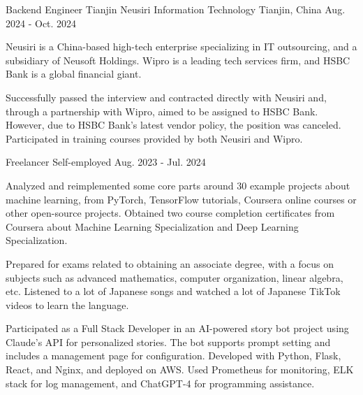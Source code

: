 
\begin{cventries}

  \cventry
    {Backend Engineer} %
    {Tianjin Neusiri Information Technology} %
    {Tianjin, China} %
    {Aug. 2024 - Oct. 2024} %
    {
      \begin{cvitems} %
        \item {Neusiri is a China-based high-tech enterprise specializing in IT outsourcing, and a subsidiary of Neusoft Holdings. Wipro is a leading tech services firm, and HSBC Bank is a global financial giant.}
        \item {Successfully passed the interview and contracted directly with Neusiri and, through a partnership with Wipro, aimed to be assigned to HSBC Bank. However, due to HSBC Bank's latest vendor policy, the position was canceled. Participated in training courses provided by both Neusiri and Wipro.}
      \end{cvitems}
    }

  \cventry
    {Freelancer} %
    {Self-employed} %
    {} %
    {Aug. 2023 - Jul. 2024} %
    {
      \begin{cvitems} %
        \item {Analyzed and reimplemented some core parts around 30 example projects about machine learning, from PyTorch, TensorFlow tutorials, Coursera online courses or other open-source projects. Obtained two course completion certificates from Coursera about Machine Learning Specialization and Deep Learning Specialization.}
        \item {Prepared for exams related to obtaining an associate degree, with a focus on subjects such as advanced mathematics, computer organization, linear algebra, etc. Listened to a lot of Japanese songs and watched a lot of Japanese TikTok videos to learn the language.}
        \item {Participated as a Full Stack Developer in an AI-powered story bot project using Claude's API for personalized stories. The bot supports prompt setting and includes a management page for configuration. Developed with Python, Flask, React, and Nginx, and deployed on AWS. Used Prometheus for monitoring, ELK stack for log management, and ChatGPT-4 for programming assistance.}
      \end{cvitems}
    }


\end{cventries}
